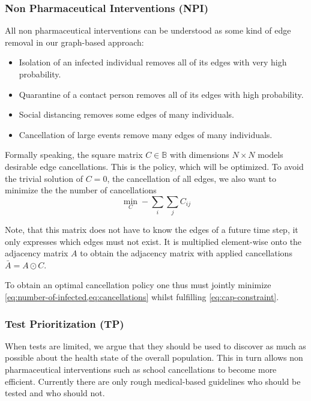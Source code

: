 \subsubsection{Non Pharmaceutical Interventions (NPI)}
All non pharmaceutical interventions can be understood as some kind of edge removal in our graph-based approach:
\begin{itemize}
	\item Isolation of an infected individual removes all of its edges with very high probability.
	\item Quarantine of a contact person removes all of its edges with high probability.
	\item Social distancing removes some edges of many individuals.
	\item Cancellation of large events remove many edges of many individuals.
\end{itemize}

Formally speaking, the square matrix $C \in \mathbb{B}$ with dimensions $N \times N$ models desirable edge cancellations.
This is the policy, which will be optimized.
To avoid the trivial solution of $C=0$, the cancellation of all edges, we also want to minimize the the number of cancellations
\begin{equation}\label{eq:cancellations}
	\min_{C} -\sum_i \sum_j C_{ij}
\end{equation}

Note, that this matrix does not have to know the edges of a future time step, it only expresses which edges must not exist.
It is multiplied element-wise onto the adjacency matrix $A$ to obtain the adjacency matrix with applied cancellations $\bar{A} = A \odot C$.


To obtain an optimal cancellation policy one thus must jointly minimize \cref{eq:number-of-infected,eq:cancellations} whilst fulfilling \cref{eq:cap-constraint}.

\subsubsection{Test Prioritization (TP)}
When tests are limited, we argue that they should be used to discover as much as possible about the health state of the overall population.
This in turn allows non pharmaceutical interventions such as school cancellations to become more efficient.
Currently there are only rough medical-based guidelines who should be tested and who should not.

